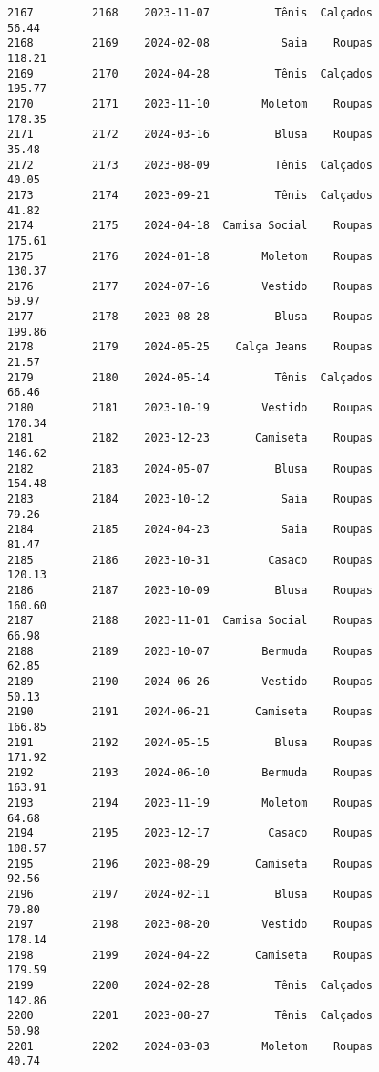\documentclass[11pt]{article}
\begin{document}
\begin{Verbatim}[commandchars=\\\{\}]
2167         2168    2023-11-07          Tênis  Calçados           56.44   
2168         2169    2024-02-08           Saia    Roupas          118.21   
2169         2170    2024-04-28          Tênis  Calçados          195.77   
2170         2171    2023-11-10        Moletom    Roupas          178.35   
2171         2172    2024-03-16          Blusa    Roupas           35.48   
2172         2173    2023-08-09          Tênis  Calçados           40.05   
2173         2174    2023-09-21          Tênis  Calçados           41.82   
2174         2175    2024-04-18  Camisa Social    Roupas          175.61   
2175         2176    2024-01-18        Moletom    Roupas          130.37   
2176         2177    2024-07-16        Vestido    Roupas           59.97   
2177         2178    2023-08-28          Blusa    Roupas          199.86   
2178         2179    2024-05-25    Calça Jeans    Roupas           21.57   
2179         2180    2024-05-14          Tênis  Calçados           66.46   
2180         2181    2023-10-19        Vestido    Roupas          170.34   
2181         2182    2023-12-23       Camiseta    Roupas          146.62   
2182         2183    2024-05-07          Blusa    Roupas          154.48   
2183         2184    2023-10-12           Saia    Roupas           79.26   
2184         2185    2024-04-23           Saia    Roupas           81.47   
2185         2186    2023-10-31         Casaco    Roupas          120.13   
2186         2187    2023-10-09          Blusa    Roupas          160.60   
2187         2188    2023-11-01  Camisa Social    Roupas           66.98   
2188         2189    2023-10-07        Bermuda    Roupas           62.85   
2189         2190    2024-06-26        Vestido    Roupas           50.13   
2190         2191    2024-06-21       Camiseta    Roupas          166.85   
2191         2192    2024-05-15          Blusa    Roupas          171.92   
2192         2193    2024-06-10        Bermuda    Roupas          163.91   
2193         2194    2023-11-19        Moletom    Roupas           64.68   
2194         2195    2023-12-17         Casaco    Roupas          108.57   
2195         2196    2023-08-29       Camiseta    Roupas           92.56   
2196         2197    2024-02-11          Blusa    Roupas           70.80   
2197         2198    2023-08-20        Vestido    Roupas          178.14   
2198         2199    2024-04-22       Camiseta    Roupas          179.59   
2199         2200    2024-02-28          Tênis  Calçados          142.86   
2200         2201    2023-08-27          Tênis  Calçados           50.98   
2201         2202    2024-03-03        Moletom    Roupas           40.74   

\end{Verbatim}
\end{document}
